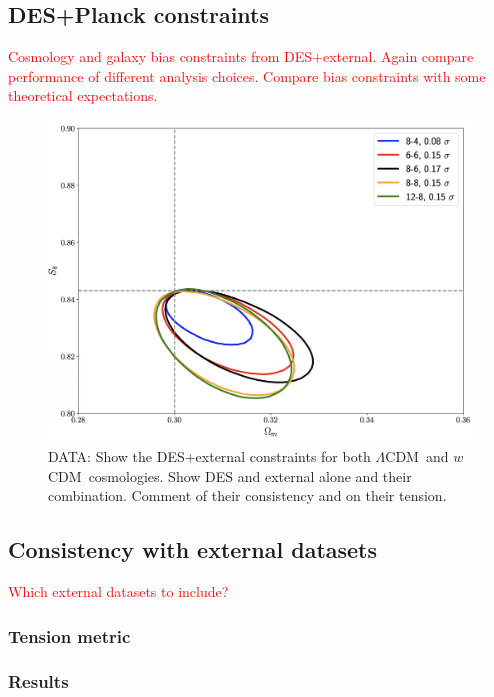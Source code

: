 \documentclass[fleqn,usenatbib]{mnras}
\newcommand{\lcdm}{$\Lambda$CDM}
\newcommand{\wcdm}{$w$CDM}
\newcommand{\red}[1]{\textcolor{red}{#1}}
\begin{document}
\subsection{DES+Planck constraints}

\red{Cosmology and galaxy bias constraints from DES+external. Again compare performance of different analysis choices. Compare bias constraints with some theoretical expectations.}

\begin{figure}
\includegraphics[width=\columnwidth,draft]{figs/temp.png}
\caption[]{DATA: Show the DES+external constraints for both \lcdm \ and \wcdm \ cosmologies. Show DES and external alone and their combination. Comment of their consistency and on their tension. }
\label{fig:bias_relation}
\end{figure}

\subsection{Consistency with external datasets}
\red{Which external datasets to include?}

\subsubsection{Tension metric}

\subsubsection{Results}
\end{document}
